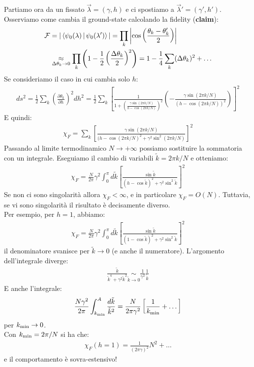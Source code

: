 \documentclass[../../InformazioneQuantistica.tex]{subfiles}
\begin{document}
Partiamo ora da un fissato $\vec{\lambda}=(\gamma,h)$ e ci spostiamo a $\vec{\lambda}' = (\gamma',h')$. Osserviamo come cambia il ground-state calcolando la fidelity (\textbf{claim}):
\begin{align*}
\mathcal{F} &= |\Braket{\psi_0(\lambda)|\psi_0(\lambda')} | = \prod_k \left|\cos\left(\frac{\theta_k-\theta_k'}{2}\right)\right|\\
&\underset{\Delta \theta_k \to 0}{\approx} \prod_k \left( 1- \frac{1}{2}\left(\frac{\Delta \theta_k}{2}\right)^2 \right) =1 - \frac{1}{4}\sum_k (\Delta \theta_k)^2 + \dots 
\end{align*}
Se consideriamo il caso in cui cambia solo $h$:
\begin{align*}
ds^2 = \frac{1}{2}\sum_k \left(\frac{\partial \theta_k}{\partial h}\right)^2 dh^2 = \frac{1}{2}\sum_k \left[\frac{1}{1+\left(\frac{\gamma \sin(2\pi k/N)}{h-\cos(2\pi k/N)}\right)^2} \left(-\frac{\gamma \sin(2\pi k/N)}{(h-\cos(2\pi k/N))^2}\right) \right]^2
\end{align*}
E quindi:
\begin{align*}
\chi_F = \sum_k \left[\frac{\gamma \sin(2\pi k/N)}{(h-\cos(2\pi k/N)^2 + \gamma^2 \sin^2 (2\pi k/N)}\right]^2
\end{align*}
Passando al limite termodinamico $N\to +\infty$ possiamo sostituire la sommatoria con un integrale. Eseguiamo il cambio di variabili $\tilde{k}= 2\pi k/N$ e otteniamo:
\begin{align*}
\chi_F =\frac{N}{2\pi} \gamma^2 \int_0^\pi d\tilde{k} \left[\frac{\sin \tilde{k}}{(h-\cos\tilde{k})^2 + \gamma^2 \sin^2 \tilde{k}}\right]^2
\end{align*}
Se non ci sono singolarità allora $\chi_F < \infty$, e in particolare $\chi_F=O(N)$. Tuttavia, se vi sono singolarità il risultato è decisamente diverso.\\
Per esempio, per $h=1$, abbiamo:
\begin{align*}
\chi_F = \frac{N}{2\pi} \gamma^2 \int_0^\pi d\tilde{k} \left[\frac{\sin \tilde{k}}{(1-\cos\tilde{k})^2 + \gamma^2 \sin^2 \tilde{k}}\right]^2
\end{align*}
il denominatore svanisce per $\tilde{k}\to 0$ (e anche il numeratore). L'argomento dell'integrale diverge:
\begin{align*}
\frac{\tilde{k}}{\tilde{k}^4+\gamma^2 \tilde{k}^2} \underset{\tilde{k}\to 0}{\sim} \frac{1}{\gamma^2}\frac{1}{\tilde{k}}
\end{align*}
E anche l'integrale:
\begin{align*}
\frac{N\gamma^2}{2\pi} \int_{k_{\min}}^A \frac{d\tilde{k}}{\tilde{k}^2} = \frac{N}{2\pi \gamma^2} \left[\frac{1}{k_{\operatorname{min}}}+\dots \right]
\end{align*}
per $k_{\operatorname{min}}\to 0$.\\
Con $k_{\operatorname{min}}=2\pi/N$ si ha che:
\begin{align*}
\chi_F ( h=1) = \frac{1}{(2\pi \gamma)^2} N^2 + \dots
\end{align*}
e il comportamento è sovra-estensivo!
\end{document}
